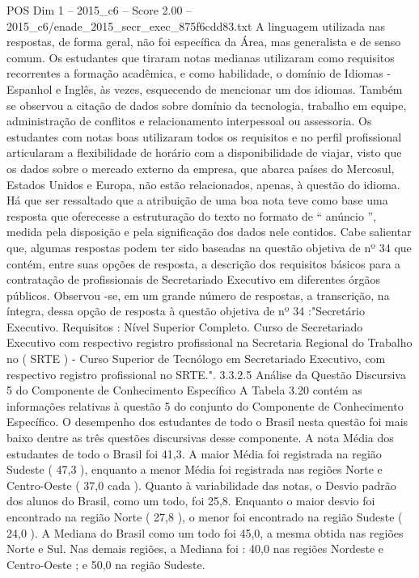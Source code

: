 \begin{textsample}{POS Dim 1 – 2015\_c6 – Score 2.00 – 2015\_c6/enade\_2015\_secr\_exec\_875f6cdd83.txt}
A linguagem utilizada nas respostas, de forma geral, não foi específica da Área, mas generalista e de senso comum.
Os estudantes que tiraram notas medianas utilizaram como requisitos recorrentes a formação acadêmica, e como habilidade, o domínio de Idiomas - Espanhol e Inglês, às vezes, esquecendo de mencionar um dos idiomas.
Também se observou a citação de dados sobre domínio da tecnologia, trabalho em equipe, administração de conflitos e relacionamento interpessoal ou assessoria.
Os estudantes com notas boas utilizaram todos os requisitos e no perfil profissional articularam a flexibilidade de horário com a disponibilidade de viajar, visto que os dados sobre o mercado externo da empresa, que abarca países do Mercosul, Estados Unidos e Europa, não estão relacionados, apenas, à questão do idioma.
Há que ser ressaltado que a atribuição de uma boa nota teve como base uma resposta que oferecesse a estruturação do texto no formato de “ anúncio ”, medida pela disposição e pela significação dos dados nele contidos.
Cabe salientar que, algumas respostas podem ter sido baseadas na questão objetiva de nº 34 que contém, entre suas opções de resposta, a descrição dos requisitos básicos para a contratação de profissionais de Secretariado Executivo em diferentes órgãos públicos.
Observou -se, em um grande número de respostas, a transcrição, na íntegra, dessa opção de resposta à questão objetiva de nº 34 :"Secretário Executivo.
Requisitos : Nível Superior Completo.
Curso de Secretariado Executivo com respectivo registro profissional na Secretaria Regional do Trabalho no ( SRTE ) - Curso Superior de Tecnólogo em Secretariado Executivo, com respectivo registro profissional no SRTE.". 3.3.2.5 Análise da Questão Discursiva 5 do Componente de Conhecimento Específico A Tabela 3.20 contém as informações relativas à questão 5 do conjunto do Componente de Conhecimento Específico.
O desempenho dos estudantes de todo o Brasil nesta questão foi mais baixo dentre as três questões discursivas desse componente.
A nota Média dos estudantes de todo o Brasil foi 41,3.
A maior Média foi registrada na região Sudeste ( 47,3 ), enquanto a menor Média foi registrada nas regiões Norte e Centro-Oeste ( 37,0 cada ).
Quanto à variabilidade das notas, o Desvio padrão dos alunos do Brasil, como um todo, foi 25,8.
Enquanto o maior desvio foi encontrado na região Norte ( 27,8 ), o menor foi encontrado na região Sudeste ( 24,0 ).
A Mediana do Brasil como um todo foi 45,0, a mesma obtida nas regiões Norte e Sul.
Nas demais regiões, a Mediana foi : 40,0 nas regiões Nordeste e Centro-Oeste ; e 50,0 na região Sudeste.

\end{textsample}
